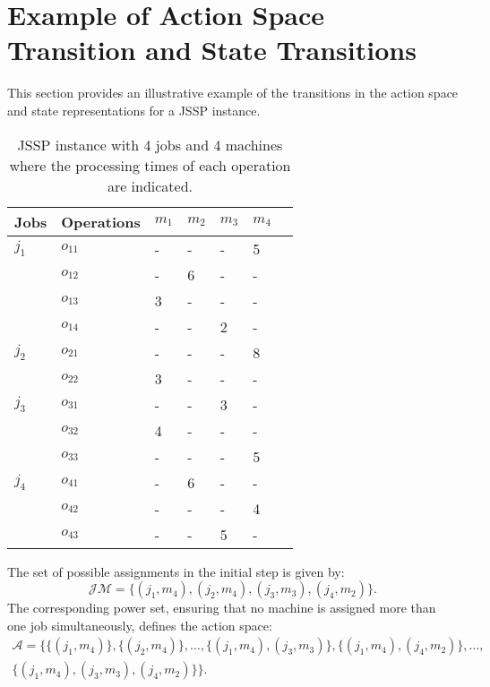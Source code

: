 \section{Example of Action Space Transition and State Transitions}
\label{app:example}

This section provides an illustrative example of the transitions in the action space and state representations for a JSSP instance. 


\begin{table}[h]
\caption{JSSP instance with 4 jobs and 4 machines where the processing times of each operation are indicated.}
\label{tab:jssp_example}%
\begin{tabularx}{\columnwidth}{X X X X X X X}
\toprule
Jobs  & Operations & \(m_1\) & \(m_2\) & \(m_3\) & \(m_4\) \\ \midrule
\(j_1\) & \(o_{11}\) & - & - & - & 5 \\
       & \(o_{12}\) & - & 6 & - & - \\
       & \(o_{13}\) & 3 & - & - & - \\
       & \(o_{14}\) & - & - & 2 & - \\
\hline
\(j_2\) & \(o_{21}\) & - & - & - & 8 \\ %
       & \(o_{22}\) & 3 & - & - & - \\ %
\hline
\(j_3\) & \(o_{31}\) & - & - & 3 & - \\
       & \(o_{32}\) & 4 & - & - & - \\
       & \(o_{33}\) & - & - & - & 5 \\
\hline
\(j_4\) & \(o_{41}\) & - & 6 & - & - \\ %
       & \(o_{42}\) & - & - & - & 4 \\ %
       & \(o_{43}\) & - & - & 5 & - \\ \bottomrule
\end{tabularx}
\end{table}

The set of possible assignments in the initial step is given by:
\[
\mathcal{JM} = \{(j_1, m_4), (j_2, m_4), (j_3, m_3), (j_4, m_2)\}.
\]
The corresponding power set, ensuring that no machine is assigned more than one job simultaneously, defines the action space:
\begin{multline}
\mathcal{A} = \{ \{(j_1, m_4)\}, \{(j_2, m_4)\}, \dots, \{(j_1, m_4), (j_3, m_3)\}, \{(j_1, m_4), (j_4, m_2)\}, \dots, \\
\{(j_1, m_4), (j_3, m_3), (j_4, m_2)\} \}.
\end{multline}


